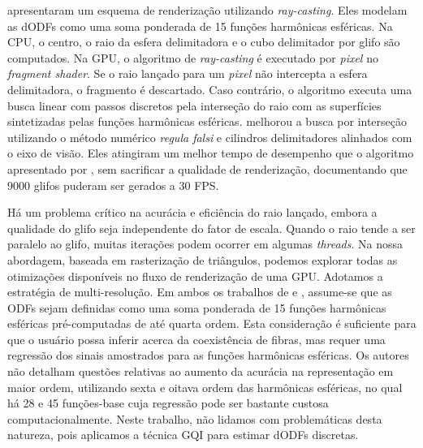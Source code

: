 

 apresentaram um esquema de renderização utilizando \textit{ray-casting}. Eles modelam as dODFs como uma soma ponderada de 15 funções harmônicas esféricas. Na CPU, o centro, o raio da esfera delimitadora e o cubo delimitador por glifo são computados. Na GPU, o algoritmo de \textit{ray-casting} é executado por \textit{pixel} no \textit{fragment shader}. Se o raio lançado para um \textit{pixel} não intercepta a esfera delimitadora, o fragmento é descartado. Caso contrário, o algoritmo executa uma busca linear com passos discretos pela interseção do raio com as superfícies sintetizadas pelas funções harmônicas esféricas.  melhorou a busca por interseção utilizando o método numérico \textit{regula falsi} e cilindros delimitadores alinhados com o eixo de visão. Eles atingiram um melhor tempo de desempenho que o algoritmo apresentado por , sem sacrificar a qualidade de renderização, documentando que 9000 glifos puderam ser gerados a 30 FPS. 

Há um problema crítico na acurácia e eficiência do raio lançado, embora a qualidade do glifo seja independente do fator de escala. Quando o raio tende a ser paralelo ao glifo, muitas iterações podem ocorrer em algumas \textit{threads}. Na nossa abordagem, baseada em rasterização de triângulos, podemos explorar todas as otimizações disponíveis no fluxo de renderização de uma GPU. Adotamos a estratégia de multi-resolução.
Em ambos os trabalhos de  e , assume-se que as ODFs sejam definidas como uma soma ponderada de 15 funções harmônicas esféricas pré-computadas de até quarta ordem. Esta consideração é suficiente para que o usuário possa inferir acerca da coexistência de fibras, mas requer uma regressão dos sinais amostrados para as funções harmônicas esféricas. Os autores não detalham questões relativas ao aumento da acurácia na representação em maior ordem, utilizando sexta e oitava ordem das harmônicas esféricas, no qual há 28 e 45 funções-base \cite{descoteaux2007_QBI} cuja regressão pode ser bastante custosa computacionalmente. Neste trabalho, não lidamos com problemáticas desta natureza, pois aplicamos a técnica GQI para estimar dODFs discretas.

